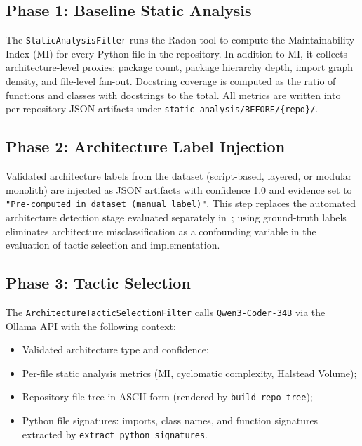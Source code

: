 \documentclass[sigconf,review,anonymous]{acmart}
\begin{document}
\subsection{Phase 1: Baseline Static Analysis}

The \texttt{StaticAnalysisFilter} runs the Radon tool to compute the Maintainability Index (MI) for every Python file in the repository. In addition to MI, it collects architecture-level proxies: package count, package hierarchy depth, import graph density, and file-level fan-out. Docstring coverage is computed as the ratio of functions and classes with docstrings to the total. All metrics are written into per-repository JSON artifacts under \texttt{static\_analysis/BEFORE/\{repo\}/}.

\subsection{Phase 2: Architecture Label Injection}

Validated architecture labels from the dataset (script-based, layered, or modular monolith) are injected as JSON artifacts with confidence 1.0 and evidence set to \texttt{"Pre-computed in dataset (manual label)"}. This step replaces the automated architecture detection stage evaluated separately in~\cite{chertkov_2026_20051151}; using ground-truth labels eliminates architecture misclassification as a confounding variable in the evaluation of tactic selection and implementation.

\subsection{Phase 3: Tactic Selection}
\label{sec:impl_tactic_selection}

The \texttt{ArchitectureTacticSelectionFilter} calls \texttt{Qwen3-Coder-34B} via the Ollama API with the following context:
\begin{itemize}[nosep]
    \item Validated architecture type and confidence;
    \item Per-file static analysis metrics (MI, cyclomatic complexity, Halstead Volume);
    \item Repository file tree in ASCII form (rendered by \texttt{build\_repo\_tree});
    \item Python file signatures: imports, class names, and function signatures extracted by \texttt{extract\_python\_signatures}.
\end{itemize}
\end{document}
